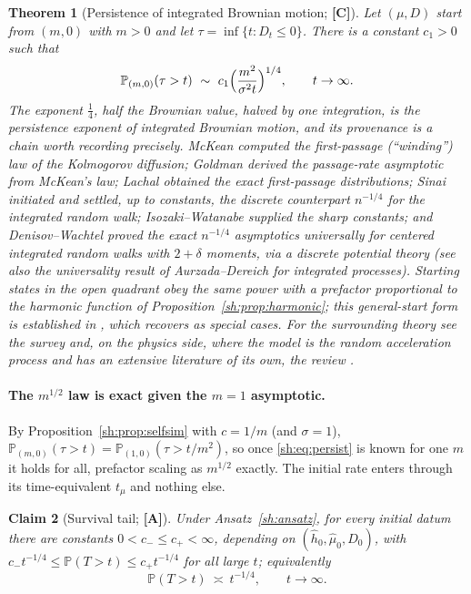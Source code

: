 \documentclass[11pt]{article}
\numberwithin{equation}{section}
\theoremstyle{plain}
\newtheorem{theorem}{Theorem}[section]
\newtheorem{claim}[theorem]{Claim}
\theoremstyle{definition}
\theoremstyle{remark}
\newcommand{\PP}{\mathbb{P}}
\begin{document}
\begin{theorem}[Persistence of integrated Brownian motion; \textbf{[C]}]
\label{sh:thm:persist}
Let $(\mu,D)$ start from $(m,0)$ with $m>0$ and let
$\tau=\inf\{t:D_t\le0\}$. There is a constant $c_1>0$ such that
\begin{equation}\label{sh:eq:persist}
\PP_{(m,0)}(\tau>t)\ \sim\ c_1\Bigl(\frac{m^2}{\sigma^2t}\Bigr)^{1/4},
\qquad t\to\infty .
\end{equation}
The exponent $\tfrac14$, half the Brownian value, halved by one
integration, is the persistence exponent of integrated Brownian
motion, and its provenance is a chain worth recording precisely. McKean
\cite{McK63} computed the first-passage (``winding'') law of the
Kolmogorov diffusion; Goldman \cite{Gol71} derived the passage-rate
asymptotic from McKean's law; Lachal \cite{Lac91} obtained the exact
first-passage distributions; Sinai \cite{Sin92} initiated and settled,
up to constants, the discrete counterpart $n^{-1/4}$ for the integrated
random walk; Isozaki--Watanabe \cite{IW94} supplied the sharp constants;
and Denisov--Wachtel \cite{DW15} proved the exact $n^{-1/4}$ asymptotics
universally for centered integrated random walks with $2+\delta$
moments, via a discrete potential theory (see also the universality
result of Aurzada--Dereich \cite{AD13} for integrated processes).
Starting states in the open quadrant obey the same power with a
prefactor proportional to the harmonic function of
Proposition~\ref{sh:prop:harmonic}; this general-start form is
established in \cite{GJW99}, which recovers \cite{Gol71,IW94} as
special cases. For the surrounding theory see the survey \cite{AS15}
and, on the physics side, where the model is the \emph{random
acceleration process} and has an extensive literature of its own, the review \cite{BMS13}.
\end{theorem}

\paragraph{The $m^{1/2}$ law is exact given the $m=1$ asymptotic.}
By Proposition~\ref{sh:prop:selfsim} with $c=1/m$ (and $\sigma=1$),
$\PP_{(m,0)}(\tau>t)=\PP_{(1,0)}(\tau>t/m^2)$, so once
\eqref{sh:eq:persist} is known for one $m$ it holds for all, prefactor
scaling as $m^{1/2}$ exactly. The initial rate enters through its
time-equivalent $t_\mu$ and nothing else.

\begin{claim}[Survival tail; \textbf{[A]}]\label{sh:claim:tail}
Under Ansatz~\ref{sh:ansatz}, for every initial datum there are
constants $0<c_-\le c_+<\infty$, depending on
$(\hat h_0,\hat\mu_0,\hat D_0)$, with
$c_-t^{-1/4}\le\PP(T>t)\le c_+t^{-1/4}$ for all large $t$;
equivalently
\begin{equation}\label{sh:eq:tail}
\PP(T>t)\ \asymp\ t^{-1/4},\qquad t\to\infty .
\end{equation}
\end{claim}
\end{document}
